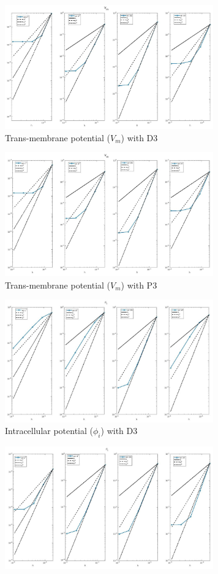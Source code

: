 \documentclass[a4paper,11pt]{article}
\begin{document}
\restoregeometry
\newpage
{} 
\begin{figure}[h] \caption{Comparison between Dubiner and FEM with third order polynomials} \label{P3-D3_plot}
\begin{subfigure}{0.5\textwidth}
\includegraphics[width = 9cm]{./D3_Vm_1.jpg}
\caption{Trans-membrane potential ($V_m$) with D3}
\end{subfigure}
\begin{subfigure}{0.5\textwidth}
\includegraphics[width =9cm]{./P3_Vm_1.jpg}
\caption{Trans-membrane potential  ($V_m$) with P3}
\end{subfigure}
\begin{subfigure}{0.5\textwidth}
\includegraphics[width = 9cm]{./D3_Phii_1.jpg}
\caption{Intracellular potential ($\phi_i$) with D3}
\end{subfigure}
\begin{subfigure}{0.5\textwidth}
\includegraphics[width =9cm]{./P3_Phii_1.jpg}

\end{subfigure}
\end{figure}
\end{document}
